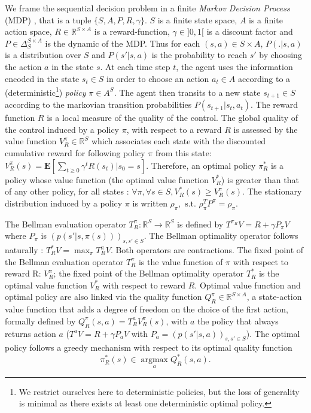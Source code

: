 \documentclass[smallextended]{svjour3}
\newcommand{\E}{\mathbf{E}}
\newcommand{\argmax}{\operatorname*{argmax}} %
\begin{document}
We frame the sequential decision problem in a finite \emph{Markov Decision Process} (MDP) \cite{puterman1994markov}, that is a tuple $\{S,A,P,R,\gamma\}$. $S$ is a finite state space, $A$ is a finite action space, $R\in\mathbb{R}^{S\times A}$ is a reward-function, $\gamma\in ]0,1[$ is a discount factor and $P\in \Delta_{S}^{S\times A}$ is the dynamic of the MDP. Thus for each $(s,a)\in S\times A$, $P(.|s,a)$ is a distribution over $S$ and $P(s'|s,a)$ is the probability to reach $s'$ by choosing the action $a$ in the state $s$. At each time step $t$, the agent uses the information encoded in the state $s_t\in S$ in order to choose an action $a_t \in A$ according to a (deterministic\footnote{We restrict ourselves here to deterministic policies, but the loss of generality is minimal as there exists at least one deterministic optimal policy.}) \emph{policy} $\pi\in A^S$. The agent then transits to a new state $s_{t+1}\in S$ according to the markovian transition probabilities $P(s_{t+1}|s_t,a_t)$. The reward function $R$ is a local measure of the quality of the control. The global quality of the control induced by a policy $\pi$, with respect to a reward $R$ is assessed by the value function $V^\pi_R \in \mathbb{R}^{S}$ which associates each state with the discounted cumulative reward for following policy $\pi$ from this state: $V^\pi_R(s) = \E[\sum_{t\geq 0}\gamma^tR(s_t)|s_0 = s]$. Therefore, an optimal policy $\pi^*_R$ is a policy whose value function (the optimal value function $V^*_R$) is greater than that of any other policy, for all states : $\forall \pi, \forall s \in S, V^*_R(s) \geq V^\pi_R(s)$. The stationary distribution induced by a policy $\pi$ is written $\rho_\pi,\textrm{ s.t. }\rho_\pi^TP^\pi = \rho_\pi$.

The Bellman evaluation operator $T^\pi_R: \mathbb{R}^{S} \rightarrow  \mathbb{R}^{S}$ is defined by $T^{\pi_R}V = R + \gamma P_\pi V$ where $P_\pi$ is $(p(s'|s,\pi(s)))_{s,s' \in S}$. The Bellman optimality operator follows naturally : $T^*_RV = \max_\pi T^\pi_RV$. Both operators are contractions. The fixed point of the Bellman evaluation operator $T^\pi_R$ is the value function of $\pi$ with respect to reward R: $V^\pi_R$; the fixed point of the Bellman optimality operator $T^*_R$ is the optimal value function $V_R^*$ with respect to reward $R$. Optimal value function and optimal policy are also linked via the quality function $Q^\pi_R\in\mathbb{R}^{S\times A}$, a state-action value function that adds a degree of freedom on the choice of the first action, formally defined by $Q^\pi_R(s,a) = T^a_RV^\pi_R(s)$, with $a$ the policy that always returns action $a$ ($T^aV = R + \gamma P_a V$ with $P_a = (p(s'|s,a))_{s,s' \in S}$). The optimal policy follows a greedy mechanism with respect to its optimal quality function 
\begin{equation}
  \label{eq:greedy}
  \pi^*_R(s)\in\argmax_aQ^*_R(s,a).
\end{equation}
\end{document}
